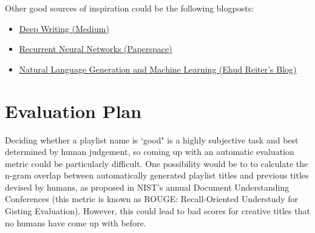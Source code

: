 \documentclass{article} %
\begin{document}
Other good sources of inspiration could be the following blogposts:
\begin{itemize}
	\item \href{https://medium.com/deep-writing}{Deep Writing (Medium)}
	\item \href{https://blog.paperspace.com/recurrent-neural-networks-part-1-2/}{Recurrent Neural Networks (Paperspace)}
	\item \href{https://ehudreiter.com/2016/12/12/nlg-and-ml/}{Natural Language Generation and Machine Learning (Ehud Reiter's Blog)}
\end{itemize}

\section{Evaluation Plan}
Deciding whether a playlist name is `good" is a highly subjective task and best determined by human judgement, so coming up with an automatic evaluation metric could be particularly difficult.
One possibility would be to to calculate the n-gram overlap between automatically generated playlist titles and previous titles devised by humans, as proposed in NIST's annual Document Understanding Conferences (this metric is known as ROUGE: Recall-Oriented Understudy for Gisting Evaluation).
However, this could lead to bad scores for creative titles that no humans have come up with before.


\nocite{namas}
\nocite{rnnlg}


\end{document}
